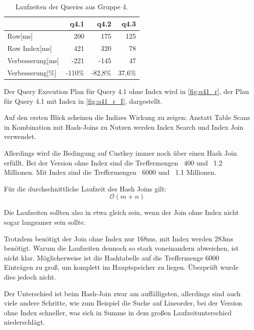 \setlength\intextsep{0pt}
\begin{table}[H]
    \begin{tabularx}{\linewidth}{lrrr}
        \toprule
                        & q4.1      &	q4.2        &	q4.3       \\
        \toprule
        Row[ms]	        & 200	    &	175	        &	125        \\
        Row Index[ms]   & 421	    &   320	        &   78          \\
        Verbesserung[ms]  & -221      &   -145        &   47         \\
        Verbesserung[\%]  & -110\%    &   -82,8\%     &   37,6\%       \\    
\bottomrule
\end{tabularx}
\caption{Laufzeiten der Queries aus Gruppe 4.}
\label{tab:q4_row}
\end{table}

Der Query Execution Plan für Query 4.1 ohne Index wird in \autoref{fig:q41_r}, der Plan für Query 4.1 mit Index in \autoref{fig:q41_r_I}, dargestellt.

Auf den ersten Blick scheinen die Indizes Wirkung zu zeigen: Anstatt Table Scans in Kombination mit Hash-Joins zu Nutzen werden Index Search und Index Join verwendet.

Allerdings wird die Bedingung auf Custkey immer noch über einen Hash Join erfüllt. Bei der Version ohne Index sind die Treffermengen ~400 und ~1.2 Millionen.
Mit Index sind die Treffermengen ~6000 und ~1.1 Millionen.

Für die durchschnittliche Laufzeit des  Hash Joins gilt:
\begin{equation}
    \mathcal{O}(m+n)
\end{equation}

Die Laufzeiten sollten also in etwa gleich sein, wenn der Join ohne Index nicht sogar langsamer sein sollte.

Trotzdem benötigt der Join ohne Index nur 168ms, mit Index werden 283ms benötigt.
Warum die Laufzeiten dennoch so stark voneinandern abweichen, ist nicht klar. Möglicherweise ist 
die Hashtabelle auf die Treffermenge 6000 Einträgen zu groß, um komplett im Hauptspeicher zu liegen.
Überprüft wurde dies jedoch nicht.

Der Unterschied ist beim Hash-Join zwar am auffälligsten, allerdings sind auch viele andere Schritte, wie zum Beispiel die Suche auf Lineorder, bei der Version ohne Index schneller, was sich in Summe in dem großen Laufzeitunterschied niederschlägt.


